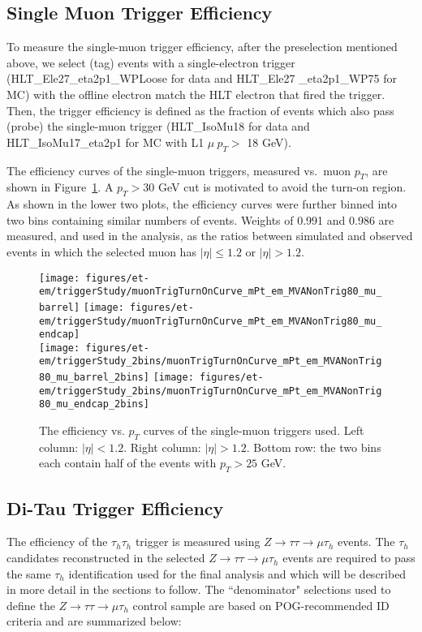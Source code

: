 \subsection{Single Muon Trigger Efficiency}\label{sec:muTrigger}
To measure the single-muon trigger efficiency, after the preselection
mentioned above, we select (tag) events with a single-electron trigger
 (HLT\_Ele27\_eta2p1\_WPLoose for data and HLT\_Ele27 \_eta2p1\_WP75 for MC) 
with the offline electron match the HLT electron that fired the trigger.
Then, the trigger efficiency is defined as the fraction of events
which also pass (probe) the single-muon trigger 
(HLT\_IsoMu18 for data and HLT\_IsoMu17\_eta2p1 for MC with L1 $\mu~p_T > $ 18 GeV).

The efficiency curves of the single-muon triggers, measured vs.~muon
$p_{T}$, are shown in Figure~\ref{fig:muturnon}. A $p_{T} > 30$ GeV cut is
motivated to avoid the turn-on region. As shown in the lower two plots,
the efficiency curves were further binned into two bins containing
similar numbers of events.  Weights of 0.991 and 0.986 are measured,
and used in the analysis, as the ratios between simulated and observed
events in which the selected muon has $|\eta| \leq 1.2$ or $|\eta|>1.2$.
\begin{figure}\centering
  \texttt{[image: figures/et-em/triggerStudy/muonTrigTurnOnCurve\_mPt\_em\_MVANonTrig80\_mu\_barrel]}
  \texttt{[image: figures/et-em/triggerStudy/muonTrigTurnOnCurve\_mPt\_em\_MVANonTrig80\_mu\_endcap]} \\
  \texttt{[image: figures/et-em/triggerStudy\_2bins/muonTrigTurnOnCurve\_mPt\_em\_MVANonTrig80\_mu\_barrel\_2bins]}
  \texttt{[image: figures/et-em/triggerStudy\_2bins/muonTrigTurnOnCurve\_mPt\_em\_MVANonTrig80\_mu\_endcap\_2bins]} \\
  \caption{\label{fig:muturnon} The efficiency vs. $p_{T}$ curves of the
    single-muon triggers used.  Left column: $|\eta|<1.2$.  Right
    column: $|\eta|>1.2$.  Bottom row: the two bins each contain half
    of the events with $p_{T} > 25$ GeV.}
\end{figure}

\subsection{Di-Tau Trigger Efficiency}\label{sec:tauTrigger}

The efficiency of the $\tau_{h}\tau_{h}$ trigger is measured using 
$Z\to\tau\tau\to\mu\tau_{h}$ events.  The $\tau_{h}$ candidates 
reconstructed in the selected $Z\to\tau\tau\to\mu\tau_{h}$ events are 
required to pass the same $\tau_{h}$ identification used for the final
analysis and which will be described in more detail in the sections to follow. The 
``denominator" selections used to define the $Z\to\tau\tau\to\mu\tau_{h}$ control sample are based on POG-recommended ID criteria and are summarized below:

